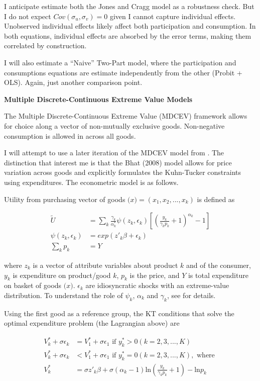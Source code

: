 \documentclass[12pt,letterpaperpaper,]{book}
\begin{document}
I anticipate estimate both the Jones and Cragg model as a robustness
check. But I do not expect \(Cov(\sigma_u, \sigma_v) = 0\) given I
cannot capture individual effects. Unobserved individual effects likely
affect both participation and consumption. In both equations, individual
effects are absorbed by the error terms, making them correlated by
construction.

I will also estimate a ``Naive'' Two-Part model, where the participation
and consumptions equations are estimate independently from the other
(Probit + OLS). Again, just another comparison point.

\textbf{Multiple Discrete-Continuous Extreme Value Models}

The \citet{bhat_multiple_2005} Multiple Discrete-Continuous Extreme
Value (MDCEV) framework allows for choice along a vector of non-mutually
exclusive goods. Non-negative consumption is allowed in across all
goods.

I will attempt to use a later iteration of the MDCEV model from
\citet{bhat_multiple_2008}. The distinction that interest me is that the
Bhat (2008) model allows for price variation across goods and explicitly
formulates the Kuhn-Tucker constraints using expenditures. The
econometric model is as follows.

Utility from purchasing vector of goods \(\bm(x) = (x_1, x_2,...,x_k)\)
is defined as

\[
\begin{aligned}
\tilde{U} &= \sum_k \frac{\gamma_k}{\alpha^*_k} \psi(z_k, \epsilon_k)
  \left [ 
    \left (
      \frac{y_k}{\gamma_k p_k} + 1
    \right )^{\alpha_k} - 1
  \right ] \\
\psi(z_k, \epsilon_k) &= exp(z'_k\beta + \epsilon_k)
\\
\sum_k p_k &= Y
\end{aligned}
\]

where \(z_k\) is a vector of attribute variables about product \(k\) and
of the consumer, \(y_k\) is expenditure on product/good \(k\), \(p_k\)
is the price, and \(Y\) is total expenditure on basket of goods
\(\bm(x)\). \(\epsilon_k\) are idiosyncratic shocks with an
extreme-value distribution. To understand the role of \(\psi_k\),
\(\alpha_k\) and \(\gamma_k\), see \citet{bhat_multiple_2008} for
details.

Using the first good as a reference group, the KT conditions that solve
the optimal expenditure problem (the Lagrangian above) are

\[
\begin{aligned}
V_k^* + \sigma \epsilon_k &= V_1^* + \sigma \epsilon_1 \text{ if }
  y_k^* > 0 (k = 2,3,...,K) \\
V_k^* + \sigma \epsilon_k &< V_1^* + \sigma \epsilon_1 \text{ if }
  y_k^* = 0 (k = 2,3,...,K), \text{ where } \\
V_k^* &= \sigma z'_k \beta + \sigma (\alpha_k - 1)
  \text{ln} \left ( \frac{y_k}{\gamma_k p_k} + 1 \right ) - \text{ln} p_k
\end{aligned}
\]
\end{document}
